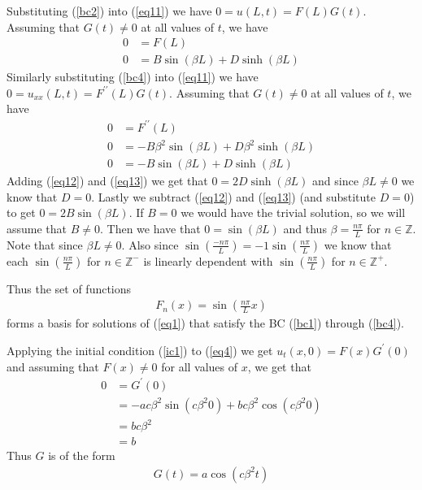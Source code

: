 \documentclass[12pt]{article}
\newcommand{\ZZ}{\mathbb{Z}}
\begin{document}
	Substituting (\ref{bc2}) into (\ref{eq11}) we have $0 = u(L,t) = F(L)G(t)$. Assuming that $G(t) \neq 0$ at all values of $t$, we have
	\begin{align}
		0 & = F(L) \nonumber \\
		0 & = B \sin(\beta L) + D \sinh(\beta L) \label{eq12}
	\end{align}
	Similarly substituting (\ref{bc4}) into (\ref{eq11}) we have $0 = u_{xx}(L,t) = F^{\prime\prime}(L)G(t)$. Assuming that $G(t) \neq 0$ at all values of $t$, we have
	\begin{align}
	0 & = F^{\prime\prime}(L) \nonumber \\
	0 & = -B \beta^2\sin(\beta L) + D \beta^2\sinh(\beta L) \nonumber \\
	0 & = -B \sin(\beta L) + D \sinh(\beta L) \label{eq13}
	\end{align}
	Adding (\ref{eq12}) and (\ref{eq13}) we get that $0=2D \sinh (\beta L)$ and since $\beta L \neq 0$ we know that $D=0$. Lastly we subtract (\ref{eq12}) and (\ref{eq13}) (and substitute $D=0$) to get $ 0 = 2B \sin(\beta L)$. If $B=0$ we would have the trivial solution, so we will assume that $B \neq 0$. Then we have that $0 = \sin(\beta L)$ and thus $\beta = \tfrac{n\pi}{L}$ for $n \in \ZZ$. Note that since $\beta L \neq 0$. Also since $\sin(\tfrac{-n\pi}{L}) = -1\sin(\tfrac{n\pi}{L})$ we know that each $\sin(\tfrac{n\pi}{L})$ for $n \in \ZZ^-$ is linearly dependent with $\sin(\tfrac{n\pi}{L})$ for $n \in \ZZ^+$. \bigbreak
	
	Thus the set of functions
	\begin{align}
		F_n(x) = \sin(\tfrac{n\pi}{L}x) \label{eq14}
	\end{align}
	forms a basis for solutions of (\ref{eq1}) that satisfy the BC (\ref{bc1}) through (\ref{bc4}). \bigbreak
	
	Applying the initial condition (\ref{ic1}) to (\ref{eq4}) we get $u_t(x,0) = F(x)G^\prime(0)$ and assuming that $F(x) \neq 0$ for all values of $x$, we get that 
	\begin{align*}
		0 & = G^\prime(0) \\
		& = -a c \beta^2 \sin(c \beta^2 0) + b c \beta^2 \cos(c \beta^2 0) \\
		& = b c \beta^2 \\
		& = b
	\end{align*}
	Thus $G$ is of the form
	\begin{align}
		G(t) = a \cos(c \beta^2 t)
	\end{align}
	
\end{document}
